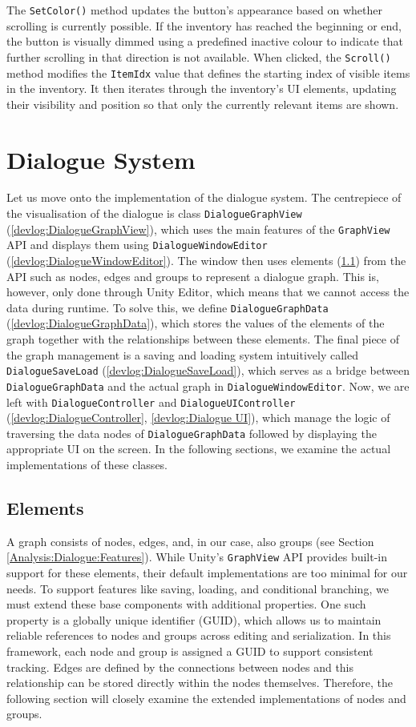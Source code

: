 The \verb|SetColor()| method updates the button’s appearance based on whether scrolling is currently possible. If the inventory has reached the beginning or end, the button is visually dimmed using a predefined inactive colour to indicate that further scrolling in that direction is not available. When clicked, the \verb|Scroll()| method modifies the \verb|ItemIdx| value that defines the starting index of visible items in the inventory. It then iterates through the inventory’s UI elements, updating their visibility and position so that only the currently relevant items are shown.


\section{Dialogue System}
\label{DialogueSystem}
Let us move onto the implementation of the dialogue system. The centrepiece of the visualisation of the dialogue is class \verb|DialogueGraphView| (\ref{devlog:DialogueGraphView}), which uses the main features of the \verb|GraphView| API and displays them using \verb|DialogueWindowEditor| (\ref{devlog:DialogueWindowEditor}). The window then uses elements (\ref{devlog:Elements}) from the API such as nodes, edges and groups to represent a dialogue graph. This is, however, only done through Unity Editor, which means that we cannot access the data during runtime. To solve this, we define \verb|DialogueGraphData| (\ref{devlog:DialogueGraphData}), which stores the values of the elements of the graph together with the relationships between these elements. The final piece of the graph management is a saving and loading system intuitively called \verb|DialogueSaveLoad| (\ref{devlog:DialogueSaveLoad}), which serves as a bridge between \verb|DialogueGraphData| and the actual graph in \verb|DialogueWindowEditor|. Now, we are left with \verb|DialogueController| and \verb|DialogueUIController| (\ref{devlog:DialogueController}, \ref{devlog:Dialogue UI}), which manage the logic of traversing the data nodes of \verb|DialogueGraphData| followed by displaying the appropriate UI on the screen. In the following sections, we examine the actual implementations of these classes.

\subsection{Elements}
\label{devlog:Elements}
A graph consists of nodes, edges, and, in our case, also groups (see Section \ref{Analysis:Dialogue:Features}). While Unity’s \verb|GraphView| API provides built-in support for these elements, their default implementations are too minimal for our needs. To support features like saving, loading, and conditional branching, we must extend these base components with additional properties. One such property is a globally unique identifier (GUID), which allows us to maintain reliable references to nodes and groups across editing and serialization. In this framework, each node and group is assigned a GUID to support consistent tracking. Edges are defined by the connections between nodes and this relationship can be stored directly within the nodes themselves. Therefore, the following section will closely examine the extended implementations of nodes and groups.


